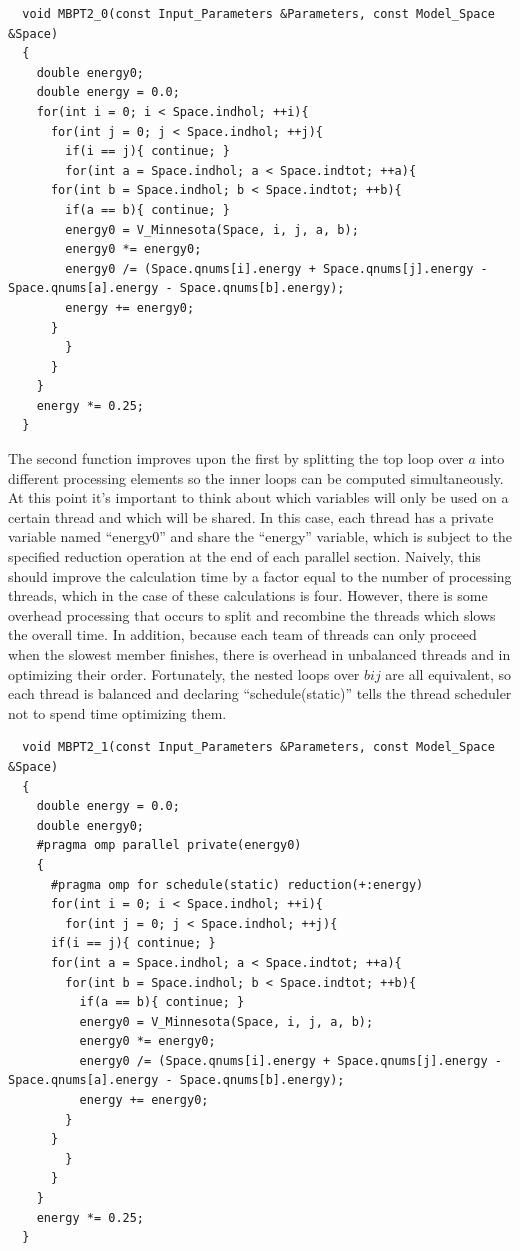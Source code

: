 \lstset{language=c++}
\begin{lstlisting}
  void MBPT2_0(const Input_Parameters &Parameters, const Model_Space &Space)
  {
    double energy0;
    double energy = 0.0;
    for(int i = 0; i < Space.indhol; ++i){
      for(int j = 0; j < Space.indhol; ++j){
        if(i == j){ continue; }
        for(int a = Space.indhol; a < Space.indtot; ++a){
	  for(int b = Space.indhol; b < Space.indtot; ++b){
	    if(a == b){ continue; }
	    energy0 = V_Minnesota(Space, i, j, a, b);
	    energy0 *= energy0;
	    energy0 /= (Space.qnums[i].energy + Space.qnums[j].energy - Space.qnums[a].energy - Space.qnums[b].energy);
	    energy += energy0;
	  }
        }
      }
    }
    energy *= 0.25;
  }
\end{lstlisting}

The second function improves upon the first by splitting the top loop over $a$ into different processing elements so the inner loops can be computed simultaneously. At this point it's important to think about which variables will only be used on a certain thread and which will be shared. In this case, each thread has a private variable named ``energy0'' and share the ``energy'' variable, which is subject to the specified reduction operation at the end of each parallel section. Naively, this should improve the calculation time by a factor equal to the number of processing threads, which in the case of these calculations is four. However, there is some overhead processing that occurs to split and recombine the threads which slows the overall time. In addition, because each team of threads can only proceed when the slowest member finishes, there is overhead in unbalanced threads and in optimizing their order. Fortunately, the nested loops over $bij$ are all equivalent, so each thread is balanced and declaring ``schedule(static)'' tells the thread scheduler not to spend time optimizing them.

\begin{lstlisting}
  void MBPT2_1(const Input_Parameters &Parameters, const Model_Space &Space)
  {
    double energy = 0.0;
    double energy0;
    #pragma omp parallel private(energy0)
    {
      #pragma omp for schedule(static) reduction(+:energy)
      for(int i = 0; i < Space.indhol; ++i){
        for(int j = 0; j < Space.indhol; ++j){
	  if(i == j){ continue; }
	  for(int a = Space.indhol; a < Space.indtot; ++a){
	    for(int b = Space.indhol; b < Space.indtot; ++b){
	      if(a == b){ continue; }
	      energy0 = V_Minnesota(Space, i, j, a, b);
	      energy0 *= energy0;
	      energy0 /= (Space.qnums[i].energy + Space.qnums[j].energy - Space.qnums[a].energy - Space.qnums[b].energy);
	      energy += energy0;
	    }
	  }
        }
      }
    }
    energy *= 0.25;
  }
\end{lstlisting}


